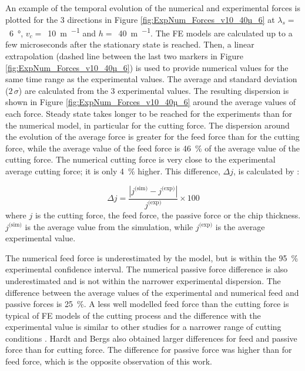 \documentclass[preprint,12pt,times]{elsarticle}
\begin{document}
An example of the temporal evolution of the numerical and experimental forces is plotted for the 3 directions in Figure \ref{fig:ExpNum_Forces_v10_40µ_6} at $\lambda_s =$~\qty{6}{\degree}, $v_c =$~\qty{10}{\m\per\min} and $h =$~\qty{40}{\m\per\min}. The FE models are calculated up to a few microseconds after the stationary state is reached. Then, a linear extrapolation (dashed line between the last two markers in Figure \ref{fig:ExpNum_Forces_v10_40µ_6}) is used to provide numerical values for the same time range as the experimental values. The average and standard deviation ($2\,\sigma$) are calculated from the 3 experimental values. The resulting dispersion is shown in Figure \ref{fig:ExpNum_Forces_v10_40µ_6} around the average values of each force. Steady state takes longer to be reached for the experiments than for the numerical model, in particular for the cutting force. The dispersion around the evolution of the average force is greater for the feed force than for the cutting force, while the average value of the feed force is \qty{46}{\%} of the average value of the cutting force. The numerical cutting force is very close to the experimental average cutting force; it is only \qty{4}{\%} higher. This difference, $\Delta j$, is calculated by :

%
\begin{equation}\label{eq:diff}
\Delta j = \frac{\left|j^\text{(sim)} - j^\text{(exp)}\right|}{j^\text{(exp)}}\times 100
\end{equation}
%
where $j$ is the cutting force, the feed force, the passive force or the chip thickness. $j^\text{(sim)}$ is the average value from the simulation, while $j^\text{(exp)}$ is the average experimental value.

The numerical feed force is underestimated by the model, but is within the \qty{95}{\%} experimental confidence interval. The numerical passive force difference is also underestimated and is not within the narrower experimental dispersion. The difference between the average values of the experimental and numerical feed and passive forces is \qty{25}{\%}. A less well modelled feed force than the cutting force is typical of FE models of the cutting process and the difference with the experimental value is similar to other studies for a narrower range of cutting conditions \cite{sima_Modified_2010, ducobu_Material_2016, karpat_Temperature_2011, zhang_Chip_2011,afrasiabi_NumericalExperimental_2021}. Hardt and Bergs \cite{hardt_Three_2021} also obtained larger differences for feed and passive force than for cutting force. The difference for passive force was higher than for feed force, which is the opposite observation of this work.
\end{document}
